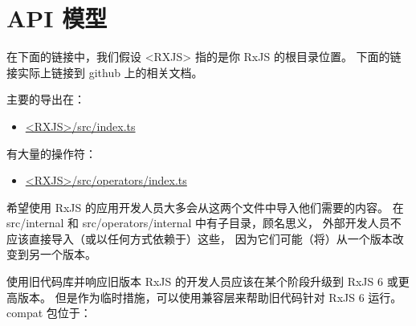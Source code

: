 \section{API 模型}


在下面的链接中，我们假设 <RXJS> 指的是你 RxJS 的根目录位置。
下面的链接实际上链接到 github 上的相关文档。


主要的导出在：

\begin{itemize}
  \item \href{https://github.com/ReactiveX/rxjs/blob/master/src/index.ts}
        {<RXJS>/src/index.ts}
\end{itemize}


有大量的操作符：

\begin{itemize}
  \item \href{https://github.com/ReactiveX/rxjs/blob/master/src/operators/index.ts}
        {<RXJS>/src/operators/index.ts}
\end{itemize}


希望使用 RxJS 的应用开发人员大多会从这两个文件中导入他们需要的内容。
在 src/internal 和 src/operators/internal 中有子目录，顾名思义，
外部开发人员不应该直接导入（或以任何方式依赖于）这些，
因为它们可能（将）从一个版本改变到另一个版本。


使用旧代码库并响应旧版本 RxJS 的开发人员应该在某个阶段升级到 RxJS 6 或更高版本。
但是作为临时措施，可以使用兼容层来帮助旧代码针对 RxJS 6 运行。
compat 包位于：


